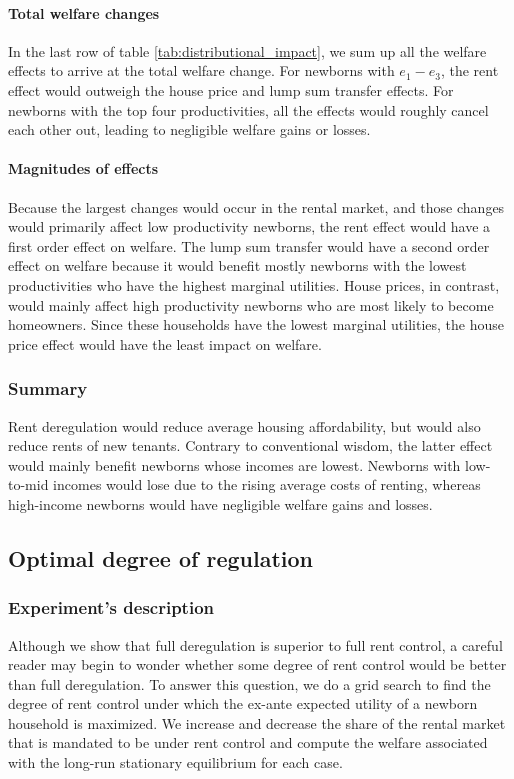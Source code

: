 \documentclass[parskip=full]{article}
\begin{document}
\paragraph{Total welfare changes} In the last row of table \ref{tab:distributional_impact}, we sum up all the welfare effects to arrive at the total welfare change. For newborns with $e_{1}-e_{3}$, the rent effect would outweigh the house price and lump sum transfer effects. For newborns with the top four productivities, all the effects would roughly cancel each other out, leading to negligible welfare gains or losses. 

\paragraph{Magnitudes of effects} Because the largest changes would occur in the rental market, and those changes would primarily affect low productivity newborns, the rent effect would have a first order effect on welfare. The lump sum transfer would have a second order effect on welfare because it would benefit mostly newborns with the lowest productivities who have the highest marginal utilities. House prices, in contrast, would mainly affect high productivity newborns who are most likely to become homeowners. Since these households have the lowest marginal utilities, the house price effect would have the least impact on welfare. 

\subsubsection{Summary} Rent deregulation would reduce average housing affordability, but would also reduce rents of new tenants. Contrary to conventional wisdom, the latter effect would mainly benefit newborns whose incomes are lowest. Newborns with low- to-mid incomes would lose due to the rising average costs of renting, whereas high-income newborns would have negligible welfare gains and losses.

\subsection{Optimal degree of regulation}

\subsubsection{Experiment's description} Although we show that full deregulation is superior to full rent control, a careful reader may begin to wonder whether some degree of rent control would be better than full deregulation. To answer this question, we do a grid search to find the degree of rent control under which the ex-ante expected utility of a newborn household is maximized. We increase and decrease the share of the rental market that is mandated to be under rent control and compute the welfare associated with the long-run stationary equilibrium for each case. 
\end{document}
